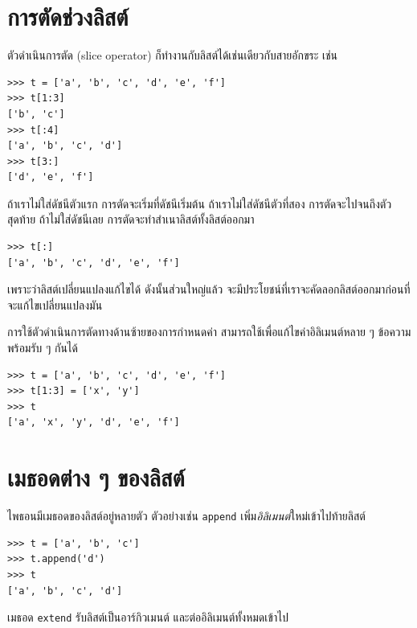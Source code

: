 \section{การตัดช่วงลิสต์}


ตัวดำเนินการตัด (slice operator) ก็ทำงานกับลิสต์ได้เช่นเดียวกับสายอักขระ เช่น

\begin{verbatim}
>>> t = ['a', 'b', 'c', 'd', 'e', 'f']
>>> t[1:3]
['b', 'c']
>>> t[:4]
['a', 'b', 'c', 'd']
>>> t[3:]
['d', 'e', 'f']
\end{verbatim}
%
ถ้าเราไม่ใส่ดัชนีตัวแรก การตัดจะเริ่มที่ดัชนีเริ่มต้น
ถ้าเราไม่ใส่ดัชนีตัวที่สอง การตัดจะไปจนถึงตัวสุดท้าย
ถ้าไม่ใส่ดัชนีเลย การตัดจะทำสำเนาลิสต์ทั้งลิสต์ออกมา


\begin{verbatim}
>>> t[:]
['a', 'b', 'c', 'd', 'e', 'f']
\end{verbatim}
%
เพราะว่าลิสต์เปลี่ยนแปลงแก้ไขได้
ดังนั้นส่วนใหญ่แล้ว จะมีประโยชน์ที่เราจะคัดลอกลิสต์ออกมาก่อนที่จะแก้ไขเปลี่ยนแปลงมัน

การใช้ตัวดำเนินการตัดทางด้านซ้ายของการกำหนดค่า
สามารถใช้เพื่อแก้ไขค่าอิลิเมนต์หลาย ๆ ข้อความพร้อมรับ ๆ กันได้

\begin{verbatim}
>>> t = ['a', 'b', 'c', 'd', 'e', 'f']
>>> t[1:3] = ['x', 'y']
>>> t
['a', 'x', 'y', 'd', 'e', 'f']
\end{verbatim}
%

\section{เมธอดต่าง ๆ ของลิสต์}

ไพธอนมีเมธอดของลิสต์อยู่หลายตัว
ตัวอย่างเช่น 
\texttt{append} เพิ่ม\textit{อิลิเมนต์}ใหม่เข้าไปท้ายลิสต์

\begin{verbatim}
>>> t = ['a', 'b', 'c']
>>> t.append('d')
>>> t
['a', 'b', 'c', 'd']
\end{verbatim}
%
เมธอด \texttt{extend} รับลิสต์เป็นอาร์กิวเมนต์
และต่ออิลิเมนต์ทั้งหมดเข้าไป

